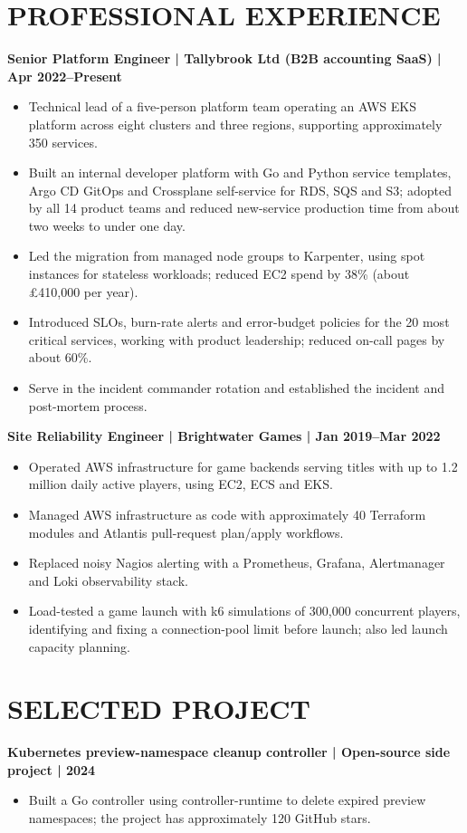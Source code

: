 \documentclass[11pt,a4paper]{article}
\begin{document}
\section*{PROFESSIONAL EXPERIENCE}
\noindent\textbf{Senior Platform Engineer | Tallybrook Ltd (B2B accounting SaaS) | Apr 2022--Present}
\begin{itemize}
\item Technical lead of a five-person platform team operating an AWS EKS platform across eight clusters and three regions, supporting approximately 350 services.
\item Built an internal developer platform with Go and Python service templates, Argo CD GitOps and Crossplane self-service for RDS, SQS and S3; adopted by all 14 product teams and reduced new-service production time from about two weeks to under one day.
\item Led the migration from managed node groups to Karpenter, using spot instances for stateless workloads; reduced EC2 spend by 38\% (about £410,000 per year).
\item Introduced SLOs, burn-rate alerts and error-budget policies for the 20 most critical services, working with product leadership; reduced on-call pages by about 60\%.
\item Serve in the incident commander rotation and established the incident and post-mortem process.
\end{itemize}
\noindent\textbf{Site Reliability Engineer | Brightwater Games | Jan 2019--Mar 2022}
\begin{itemize}
\item Operated AWS infrastructure for game backends serving titles with up to 1.2 million daily active players, using EC2, ECS and EKS.
\item Managed AWS infrastructure as code with approximately 40 Terraform modules and Atlantis pull-request plan/apply workflows.
\item Replaced noisy Nagios alerting with a Prometheus, Grafana, Alertmanager and Loki observability stack.
\item Load-tested a game launch with k6 simulations of 300,000 concurrent players, identifying and fixing a connection-pool limit before launch; also led launch capacity planning.
\end{itemize}
\section*{SELECTED PROJECT}
\noindent\textbf{Kubernetes preview-namespace cleanup controller | Open-source side project | 2024}
\begin{itemize}
\item Built a Go controller using controller-runtime to delete expired preview namespaces; the project has approximately 120 GitHub stars.
\end{itemize}
\end{document}

